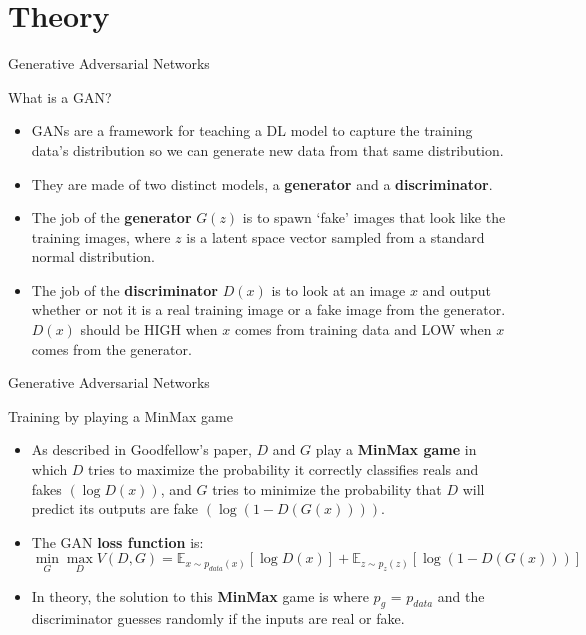 \documentclass[10pt]{beamer}
\begin{document}
\section{Theory}

{
\begin{frame}{Generative Adversarial Networks}
      \begin{block}{What is a GAN?}
	\begin{itemize}[<+- | alert@+>]
    \item GANs are a framework for teaching a DL model to capture the training data’s distribution so we can generate new data from that same distribution.
    \item They are made of two distinct models, a \textbf{generator} and a \textbf{discriminator}.
    \item The job of the \textbf{generator} $G(z)$ is to spawn ‘fake’ images that look like the training images, where $z$ is a latent space vector sampled from a standard normal distribution.
    \item The job of the \textbf{discriminator} $D(x)$ is to look at an image $x$ and output whether or not it is a real training image or a fake image from the generator.
    $D(x)$ should be HIGH when $x$ comes from training data and LOW when $x$ comes from the generator.
  \end{itemize}
    \end{block}
\end{frame}
}

{
\begin{frame}{Generative Adversarial Networks}
      \begin{block}{Training by playing a MinMax game}
	\begin{itemize}[<+- | alert@+>]
    \item As described in Goodfellow’s paper, $D$ and $G$ play a \textbf{MinMax game} in which $D$ tries to maximize the probability it correctly classifies reals and fakes $(\log D(x))$, and $G$ tries to minimize the probability that $D$ will predict its outputs are fake $(\log (1 - D(G(x)) ))$.
    \item The GAN \textbf{loss function} is:
    $$\min_G \max_D V(D,G) = \mathbb{E}_{x \sim p_{data}(x)}[\log D(x)]+\mathbb{E}_{z \sim p_z(z)}[\log(1−D(G(x)))]$$
    \item In theory, the solution to this \textbf{MinMax} game is where $p_g$ = $p_{data}$
    and the discriminator guesses randomly if the inputs are real or fake. 
  \end{itemize}
    \end{block}
\end{frame}
}
\end{document}

